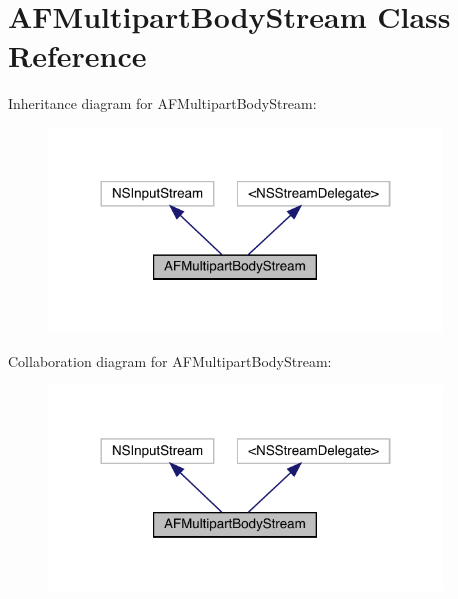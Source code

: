\hypertarget{interface_a_f_multipart_body_stream}{}\section{A\+F\+Multipart\+Body\+Stream Class Reference}
\label{interface_a_f_multipart_body_stream}


Inheritance diagram for A\+F\+Multipart\+Body\+Stream\+:\nopagebreak
\begin{figure}[H]
\begin{center}
\leavevmode
\includegraphics[width=296pt]{interface_a_f_multipart_body_stream__inherit__graph}
\end{center}
\end{figure}


Collaboration diagram for A\+F\+Multipart\+Body\+Stream\+:\nopagebreak
\begin{figure}[H]
\begin{center}
\leavevmode
\includegraphics[width=296pt]{interface_a_f_multipart_body_stream__coll__graph}
\end{center}
\end{figure}
